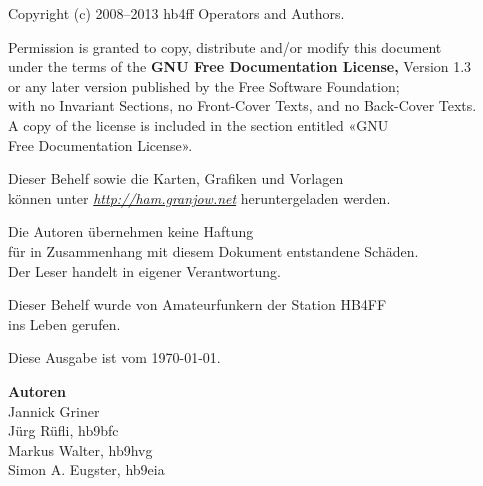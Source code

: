 {

\cleardoublepage
\vspace*{3cm}
\noindent
Copyright (c) \hspace{1em} 2008--2013 \hspace{1em} hb4ff Operators and Authors.

\vspace{1em}
\noindent
Permission is granted to copy, distribute and/or modify this document\\
under the terms of the \textbf{GNU Free Documentation License,} Version 1.3\\
or any later version published by the Free Software Foundation;\\
with no Invariant Sections, no Front-Cover Texts, and no Back-Cover Texts.\\
A copy of the license is included in the section entitled «GNU\\
Free Documentation License».

\vspace{2em}
\noindent
Dieser Behelf sowie die Karten, Grafiken und Vorlagen \\
können unter \textit{\href{http://ham.granjow.net}{http://ham.granjow.net}} heruntergeladen werden.

\vspace{2em}
\noindent
Die Autoren übernehmen keine Haftung \\
für in Zusammenhang mit diesem Dokument entstandene Schäden.\\
Der Leser handelt in eigener Verantwortung.\\

\cleardoublepage
\vspace*{3cm}
\begin{centering}
Dieser Behelf wurde von Amateurfunkern der Station HB4FF\\
ins Leben gerufen.

\vspace{1em}
Diese Ausgabe ist vom \today.

\vspace{2em}
\textbf{Autoren}\\ \vspace{4pt}
Jannick Griner\\
Jürg Rüfli, hb9bfc\\
Markus Walter, hb9hvg\\
Simon A. Eugster, hb9eia


\end{centering}}
